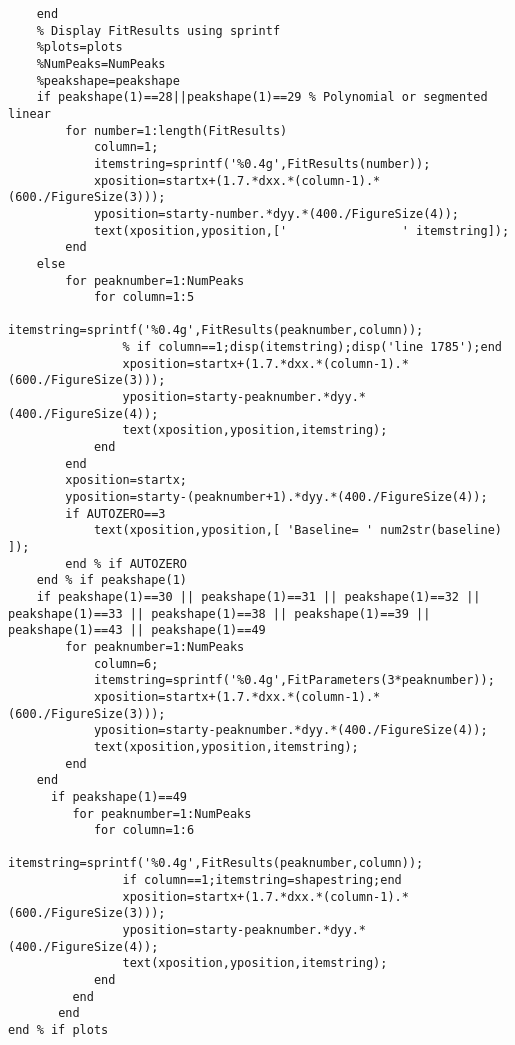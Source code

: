 \begin{lstlisting}
    end
    % Display FitResults using sprintf
    %plots=plots
    %NumPeaks=NumPeaks
    %peakshape=peakshape
    if peakshape(1)==28||peakshape(1)==29 % Polynomial or segmented linear
        for number=1:length(FitResults)
            column=1;
            itemstring=sprintf('%0.4g',FitResults(number));
            xposition=startx+(1.7.*dxx.*(column-1).*(600./FigureSize(3)));
            yposition=starty-number.*dyy.*(400./FigureSize(4));
            text(xposition,yposition,['                ' itemstring]);
        end
    else
        for peaknumber=1:NumPeaks
            for column=1:5
                itemstring=sprintf('%0.4g',FitResults(peaknumber,column));
                % if column==1;disp(itemstring);disp('line 1785');end
                xposition=startx+(1.7.*dxx.*(column-1).*(600./FigureSize(3)));
                yposition=starty-peaknumber.*dyy.*(400./FigureSize(4));
                text(xposition,yposition,itemstring);
            end
        end
        xposition=startx;
        yposition=starty-(peaknumber+1).*dyy.*(400./FigureSize(4));
        if AUTOZERO==3
            text(xposition,yposition,[ 'Baseline= ' num2str(baseline) ]);
        end % if AUTOZERO
    end % if peakshape(1)
    if peakshape(1)==30 || peakshape(1)==31 || peakshape(1)==32 || peakshape(1)==33 || peakshape(1)==38 || peakshape(1)==39 || peakshape(1)==43 || peakshape(1)==49
        for peaknumber=1:NumPeaks
            column=6;
            itemstring=sprintf('%0.4g',FitParameters(3*peaknumber));
            xposition=startx+(1.7.*dxx.*(column-1).*(600./FigureSize(3)));
            yposition=starty-peaknumber.*dyy.*(400./FigureSize(4));
            text(xposition,yposition,itemstring);
        end
    end
      if peakshape(1)==49 
         for peaknumber=1:NumPeaks
            for column=1:6
                itemstring=sprintf('%0.4g',FitResults(peaknumber,column));
                if column==1;itemstring=shapestring;end
                xposition=startx+(1.7.*dxx.*(column-1).*(600./FigureSize(3)));
                yposition=starty-peaknumber.*dyy.*(400./FigureSize(4));
                text(xposition,yposition,itemstring);
            end
         end
       end
end % if plots


\end{lstlisting}
